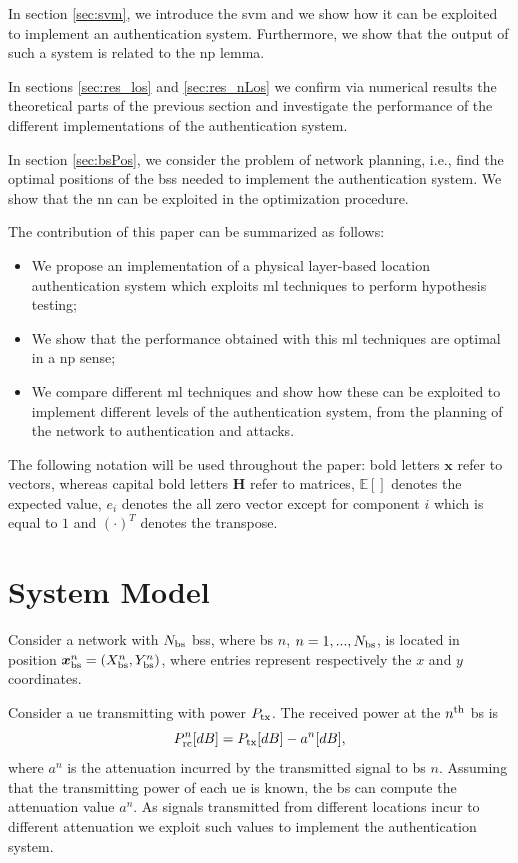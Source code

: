 \documentclass[draftcls,onecolumn,12pt]{IEEEtran}
\begin{document}
In section \ref{sec:svm}, we introduce the \ac{svm} and we show how it can be exploited to implement an authentication system. Furthermore, we show that the output of such a system is related to the \ac{np} lemma.

In sections \ref{sec:res_los} and \ref{sec:res_nLos} we confirm via numerical results the theoretical parts of the previous section and investigate the performance of the different implementations of the authentication system.

In section \ref{sec:bsPos}, we consider the problem of network planning, i.e., find the optimal positions of the \acp{bs} needed to implement the authentication system. We show that the \ac{nn} can be exploited in the optimization procedure.

The contribution of this paper can be summarized as follows:
\begin{itemize}
    \item We propose an implementation of a physical layer-based location authentication system which exploits \ac{ml} techniques to perform hypothesis testing;
    \item We show that the performance obtained with this \ac{ml} techniques are optimal in a \ac{np} sense;
    \item We compare different \ac{ml} techniques and show how these can be exploited to implement different levels of the authentication system, from the planning of the network to authentication and attacks.
\end{itemize}

The following notation will be used throughout the paper: bold letters $\bm{x}$ refer to vectors, whereas capital bold letters $\bm{H}$ refer to matrices, $\mathbb{E}[]$ denotes the expected value, $e_i$ denotes the all zero vector except for component $i$ which is equal to $1$ and $(\cdot)^T$ denotes the transpose.

\section{System Model}
Consider a network with $N_{\rm bs}$ \acp{bs}, where \ac{bs} $n$, $n=1,...,N_{\rm bs}$, is located in position $\bm{x}_{\rm bs}^n =(X_{\rm bs}^n,Y_{\rm bs}^n)$, where entries represent respectively the $x$ and $y$ coordinates. 

Consider a \ac{ue} transmitting with power $P_{\rm tx}$. The received power at the $n^{\rm th}$ \ac{bs} is
\begin{equation}
    P_{\rm rc}^n[dB]= P_{\rm tx}[dB] -  a^n[dB],
\end{equation}
where $a^n$ is the attenuation incurred by the transmitted signal to \ac{bs} $n$. Assuming that the transmitting power of each \ac{ue} is known, the \ac{bs} can compute the attenuation value $a^n$. As signals transmitted from different locations incur to different attenuation we exploit such values to implement the authentication system.
\end{document}
